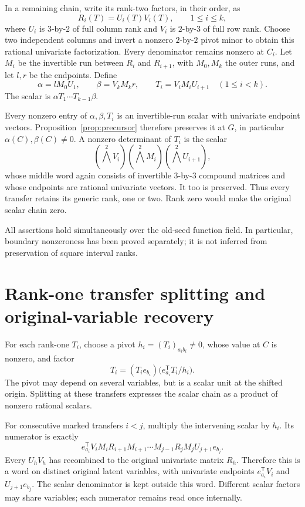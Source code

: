 \documentclass[11pt]{article}
\begin{document}
In a remaining chain, write its rank-two factors, in their order, as
\[
 R_i(T)=U_i(T)V_i(T),\qquad 1\le i\le k,
\]
where \(U_i\) is \(3\)-by-\(2\) of full column rank and \(V_i\) is
\(2\)-by-\(3\) of full row rank. Choose two independent columns and
invert a nonzero \(2\)-by-\(2\) pivot minor to obtain this rational
univariate factorization. Every denominator remains nonzero at \(C_i\).
Let \(M_i\) be the invertible run between \(R_i\) and \(R_{i+1}\),
with \(M_0,M_k\) the outer runs, and let \(l,r\) be the endpoints.
Define
\begin{equation}\label{eq:transfers}
 \alpha=lM_0U_1,\qquad \beta=V_kM_kr,\qquad
 T_i=V_iM_iU_{i+1}\quad(1\le i<k).
\end{equation}
The scalar is \(\alpha T_1\cdots T_{k-1}\beta\).

Every nonzero entry of \(\alpha,\beta,T_i\) is an invertible-run scalar
with univariate endpoint vectors. Proposition~\ref{prop:precursor}
therefore preserves it at \(G\), in particular
\(\alpha(C),\beta(C)\ne0\). A nonzero determinant of \(T_i\) is the
scalar
\[
 (\textstyle\bigwedge^2 V_i)
 (\textstyle\bigwedge^2 M_i)
 (\textstyle\bigwedge^2 U_{i+1}),
\]
whose middle word again consists of invertible \(3\)-by-\(3\) compound
matrices and whose endpoints are rational univariate vectors. It too
is preserved. Thus every transfer retains its generic rank, one or
two. Rank zero would make the original scalar chain zero.

All assertions hold simultaneously over the old-seed function field.
In particular, boundary nonzeroness has been proved separately; it is
not inferred from preservation of square interval ranks.

\section{Rank-one transfer splitting and original-variable recovery}

For each rank-one \(T_i\), choose a pivot
\(h_i=(T_i)_{a_i b_i}\ne0\), whose value at \(C\) is nonzero, and
factor
\[
 T_i=(T_ie_{b_i})\bigl(e_{a_i}^{\mathsf T}T_i/h_i\bigr).
\]
The pivot may depend on several variables, but is a scalar unit at
the shifted origin. Splitting at these transfers expresses the scalar
chain as a product of nonzero rational scalars.

For consecutive marked transfers \(i<j\), multiply the intervening
scalar by \(h_i\). Its numerator is exactly
\begin{equation}\label{eq:recombine}
 e_{a_i}^{\mathsf T}V_iM_i
 R_{i+1}M_{i+1}\cdots M_{j-1}R_j
 M_jU_{j+1}e_{b_j}.
\end{equation}
Every \(U_hV_h\) has recombined to the original univariate matrix
\(R_h\). Therefore this is a word on distinct original latent variables,
with univariate endpoints \(e_{a_i}^{\mathsf T}V_i\) and
\(U_{j+1}e_{b_j}\). The scalar denominator is kept outside this word.
Different scalar factors may share variables; each numerator remains
read once internally.
\end{document}
